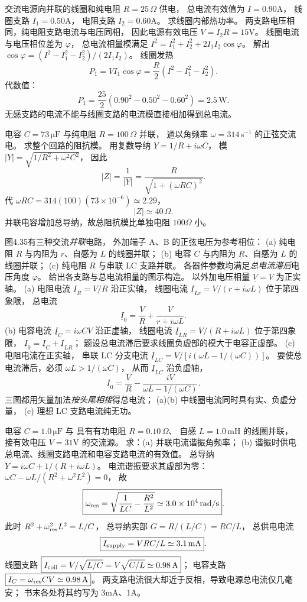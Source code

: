 交流电源向并联的线圈和纯电阻
$R=25\,\Omega$ 供电，
总电流有效值为 $I=0.90$A，
线圈支路 $I_1=0.50$A，
电阻支路 $I_2=0.60$A。
求线圈内部热功率。
\exsolution
两支路电压相同，纯电阻支路电流与电压同相，
因此电源有效电压
$V=I_2R=15$V。
线圈电流与电压相位差为 $\varphi$，
总电流相量模满足
$I^2=I_1^2+I_2^2+2I_1I_2\cos\varphi$。
解出
$\cos\varphi=(I^2-I_1^2-I_2^2)/(2I_1I_2)$。
线圈发热
\[
P_1=VI_1\cos\varphi
=\frac R2\left(I^2-I_1^2-I_2^2\right).
\]
代数值：
\[
\boxed{P_1=\frac{25}{2}(0.90^2-0.50^2-0.60^2)
=2.5\,\mathrm W}.
\]
\excheck 无感支路的电流不能与线圈支路的电流模直接相加得到总电流。

电容 $C=73\,\mathrm{\mu F}$ 与纯电阻
$R=100\,\Omega$ 并联，
通以角频率 $\omega=314\,\mathrm{s^{-1}}$ 的正弦交流电。
求整个回路的阻抗模。
\exsolution
用复数导纳
$\underline Y=1/R+i\omega C$，
模
$|Y|=\sqrt{1/R^2+\omega^2C^2}$，
因此
\[
\boxed{|Z|=\frac1{|Y|}
=\frac R{\sqrt{1+(\omega RC)^2}}}.
\]
代 $\omega RC=314(100)(73\times10^{-6})\simeq2.29$，
\[
\boxed{|Z|\simeq40\,\Omega}.
\]
\excheck 并联电容增加总导纳，故总阻抗模比单独电阻 $100\Omega$ 小。

图4.35有三种交流\emph{并联}电路，
外加端子 A、B 的正弦电压为参考相位：
(a) 纯电阻 $R$ 与内阻为 $r$、自感为 $L$ 的线圈并联；
(b) 电容 $C$ 与内阻为 $R$、自感为 $L$ 的线圈并联；
(c) 纯电阻 $R$ 与串联 LC 支路并联。
各器件参数均满足\emph{总电流滞后}电压角度 $\varphi$。
给出各支路与总电流相量的图示构造。
\exsolution
以外加电压相量 $\underline V=V$ 为正实轴。
(a) 电阻电流
$\underline I_R=V/R$ 沿正实轴，
线圈电流
$\underline I_{Lr}=V/(r+i\omega L)$ 位于第四象限，
总电流
\[
\boxed{\underline I_0=\frac VR+\frac V{r+i\omega L}}.
\]
(b) 电容电流
$\underline I_C=i\omega CV$ 沿正虚轴，
线圈电流
$\underline I_{LR}=V/(R+i\omega L)$ 位于第四象限，
$\boxed{\underline I_0=\underline I_C+\underline I_{LR}}$；
题设总电流滞后要求线圈负虚部的模大于电容正虚部。
(c) 电阻电流在正实轴，
串联 LC 分支电流
$\underline I_{LC}=V/[i(\omega L-1/(\omega C))]$。
要使总电流滞后，必须
$\omega L>1/(\omega C)$，
从而 $\underline I_{LC}$ 沿负虚轴，
\[
\boxed{\underline I_0=
\frac VR-\frac{iV}{\omega L-1/(\omega C)}}.
\]
\excheck 三图都用矢量加法\emph{按头尾相接}得总电流；
(a)(b) 中线圈电流同时具有实、负虚分量，
(c) 理想 LC 支路电流纯无功。

电容 $C=1.0\,\mathrm{\mu F}$ 与
具有有功电阻 $R=0.10\,\Omega$、
自感 $L=1.0\,\mathrm{mH}$ 的线圈并联，
接有效电压 $V=31$V 的交流源。
求：(a) 并联电流谐振角频率；
(b) 谐振时供电总电流、线圈支路电流和电容支路电流的有效值。
\exsolution
总导纳
$Y=i\omega C+1/(R+i\omega L)$。
电流谐振要求其虚部为零：
$\omega C-\omega L/(R^2+\omega^2L^2)=0$，
故
\[
\boxed{\omega_{\rm res}
=\sqrt{\frac1{LC}-\frac{R^2}{L^2}}
\simeq3.0\times10^4\,\mathrm{rad/s}}.
\]
此时
$R^2+\omega_{\rm res}^2L^2=L/C$，
总导纳实部
$G=R/(L/C)=RC/L$，
总供电电流
\[
\boxed{I_{\rm supply}=VRC/L
\simeq3.1\,\mathrm{mA}}.
\]
线圈支路
$\boxed{I_{\rm coil}
=V/\sqrt{L/C}=V\sqrt{C/L}\simeq0.98\,\mathrm A}$；
电容支路
$\boxed{I_C=\omega_{\rm res}CV\simeq0.98\,\mathrm A}$。
\excheck 两支路电流很大却近于反相，导致电源总电流仅几毫安；
书末各处将其约写为 $3$mA、$1$A。

